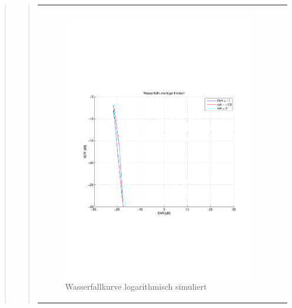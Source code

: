 \begin{quote}
\begin{quote}
\begin{center}
\begin{tabular}{ll}
\begin{minipage}{0.6\textwidth}
                        \begin{figure}[H]
                            \label{fig:}
                            \includegraphics[scale=0.45, trim = 1.5cm 7cm 1cm
                            8.5cm,
                            clip]{./Bilder/aufgabe2/Wasserfallkurve_simuliert_logarithmisch}
                            \caption{Wasserfallkurve logarithmisch simuliert}
                        \end{figure}
                    \vspace{-1.5em}
    
                    \end{minipage}
    
                \end{tabular}
                \end{center}
                

\end{quote}
\end{quote}
